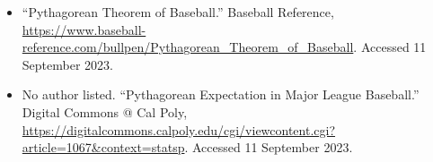 \documentclass[
]{article}
\providecommand{\tightlist}{%
  \setlength{\itemsep}{0pt}\setlength{\parskip}{0pt}}
\begin{document}
\begin{itemize}
\tightlist
\item
  ``Pythagorean Theorem of Baseball.'' Baseball Reference,
  \url{https://www.baseball-reference.com/bullpen/Pythagorean_Theorem_of_Baseball}.
  Accessed 11 September 2023.
\item
  No author listed. ``Pythagorean Expectation in Major League
  Baseball.'' Digital Commons @ Cal Poly,
  \url{https://digitalcommons.calpoly.edu/cgi/viewcontent.cgi?article=1067\&context=statsp}.
  Accessed 11 September 2023.
\end{itemize}
\end{document}

